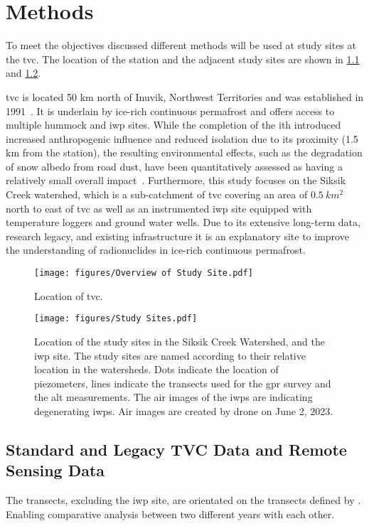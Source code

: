 \chapter{Methods}
To meet the objectives discussed different methods will be used at study sites at the \gls{tvc}. 
The location of the station and the adjacent study sites are shown in \cref{fig:study_site_overview} and \cref{fig:study_sites}.

\gls{tvc} is located 50 km north of Inuvik, Northwest Territories and was established in 1991~\citep{trailvalleycreekTrailValleyCreek2025}. 
It is underlain by ice-rich continuous permafrost and offers access to multiple hummock and \gls{iwp} sites. While the completion of the \gls{ith} introduced increased anthropogenic influence and reduced isolation due to its proximity (1.5 km from the station), the resulting environmental effects, such as the degradation of snow albedo from road dust, have been quantitatively assessed as having a relatively small overall impact~\citep{hammarSnowAccumulationAlbedo2023}. 
Furthermore, this study focuses on the Siksik Creek watershed, which is a sub-catchment of \gls{tvc} covering an area of \(\SI{0.5}{km^2}\) north to east of \gls{tvc} as well as an instrumented \gls{iwp} site equipped with temperature loggers and ground water wells. 
Due to its extensive long-term data, research legacy, and existing infrastructure it is an explanatory site to improve the understanding of radionuclides in ice-rich continuous permafrost.
\begin{figure}[htbp]
    \centering
    \texttt{[image: figures/Overview of Study Site.pdf]}
    \caption{Location of \gls{tvc}.}\label{fig:study_site_overview}
\end{figure}
\begin{figure}[htbp]
    \centering
    \texttt{[image: figures/Study Sites.pdf]}
    \caption[Location of study sites around \gls{tvc}.]{Location of the study sites in the Siksik Creek Watershed, and the \gls{iwp} site. 
        The study sites are named according to their relative location in the watersheds. 
        Dots indicate the location of piezometers, lines indicate the transects used for the \gls{gpr} survey and the \gls{alt} measurements. 
        The air images of the \glspl{iwp} are indicating degenerating \glspl{iwp}. Air images are created by drone on June 2, 2023.}\label{fig:study_sites}
\end{figure}
\section{Standard and Legacy TVC Data and Remote Sensing Data}
The transects, excluding the \gls{iwp} site, are orientated on the transects defined by \citet{dakinHowDryYear2023}. 
Enabling comparative analysis between two different years with each other. 

